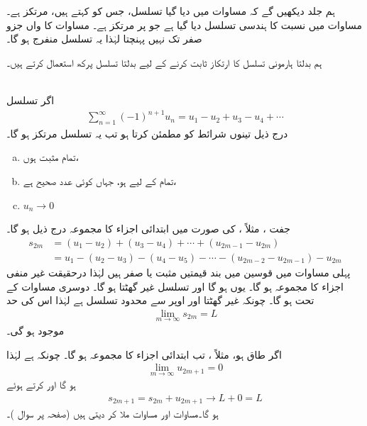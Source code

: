 ہم جلد دیکھیں گے کہ مساوات  میں دیا گیا تسلسل، جس کو  کہتے ہیں، مرتکز ہے۔ مساوات  میں  نسبت  کا ہندسی تسلسل دیا گیا ہے
 جو  پر مرتکز ہے۔ مساوات کا  واں جزو صفر تک نہیں پہنچتا لہٰذا یہ تسلسل منفرج ہو گا۔

ہم بدلتا ہارمونی تسلسل کا ارتکاز ثابت کرنے کے لیے بدلتا تسلسل پرکھ استعمال کرتے ہیں۔



\\
اگر تسلسل
\begin{align*}
\sum_{n=1}^{\infty}(-1)^{n+1}u_n=u_1-u_2+u_3-u_4+\cdots
\end{align*}
درج ذیل تینوں شرائط کو مطمئن کرتا ہو تب یہ تسلسل مرتکز ہو گا۔
\begin{enumerate}[a.]
\item
تمام مثبت ہوں،
\item
تمام  کے لیے  ہو، جہاں  کوئی عدد صحیح ہے،
\item
$u_n\to0$
\end{enumerate}
جفت ، مثلاً ، کی صورت میں ابتدائی  اجزاء کا مجموعہ درج ذیل ہو گا۔
\begin{align*}
s_{2m}&=(u_1-u_2)+(u_3-u_4)+\cdots+(u_{2m-1}-u_{2m})\\
&=u_1-(u_2-u_3)-(u_4-u_5)-\cdots-(u_{2m-2}-u_{2m-1})-u_{2m}
\end{align*}
پہلی مساوات میں قوسین میں بند قیمتیں مثبت یا صفر ہیں لہٰذا  درحقیقت  غیر منفی اجزاء کا مجموعہ ہو گا۔ یوں  ہو گا اور تسلسل  غیر گھٹتا ہو گا۔ دوسری مساوات کے تحت  ہو گا۔ چونکہ  غیر گھٹتا اور اوپر سے محدود تسلسل ہے لہٰذا اس کی حد 
\begin{align}\label{مساوات_تسلسل_بدلتا_حد_الف}
\lim_{m\to\infty}s_{2m}=L
\end{align}
موجود ہو گی۔

اگر  طاق ہو، مثلاً ، تب ابتدائی  اجزاء کا مجموعہ  ہو گا۔ چونکہ  ہے لہٰذا
\begin{align*}
\lim_{m\to\infty}u_{2m+1}=0
\end{align*}
ہو گا اور  کرتے ہوئے
\begin{align}\label{مساوات_تسلسل_بدلتا_حد_ب}
s_{2m+1}=s_{2m}+u_{2m+1}\to L+0=L
\end{align}
ہو گا۔مساوات  اور مساوات  ملا کر  دیتی  ہیں (صفحہ  پر سوال )۔

